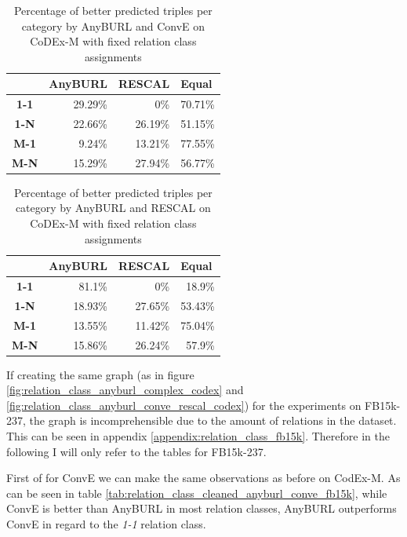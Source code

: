 \begin{table}[H]
\centering
\begin{tabular}{c|rrr}
\multicolumn{1}{l|}{} & \multicolumn{1}{c}{\textbf{AnyBURL}} & \multicolumn{1}{c}{\textbf{RESCAL}} & \multicolumn{1}{l}{\textbf{Equal}} \\ \hline
\textbf{1-1} & 29.29\% & 0\% & 70.71\% \\
\textbf{1-N} & 22.66\% & 26.19\% & 51.15\% \\
\textbf{M-1} & 9.24\% & 13.21\% & 77.55\% \\
\textbf{M-N} & 15.29\% & 27.94\% & 56.77\%
\end{tabular}
\caption{Percentage of better predicted triples per category by AnyBURL and ConvE on CoDEx-M with fixed relation class assignments}
\label{tab:relation_class_cleaned_anyburl_conve_codex}
\end{table}

\begin{table}[H]
\centering
\begin{tabular}{c|rrr}
\multicolumn{1}{l|}{} & \multicolumn{1}{c}{\textbf{AnyBURL}} & \multicolumn{1}{c}{\textbf{RESCAL}} & \multicolumn{1}{l}{\textbf{Equal}} \\ \hline
\textbf{1-1} & 81.1\% & 0\% & 18.9\% \\
\textbf{1-N} & 18.93\% & 27.65\% & 53.43\% \\
\textbf{M-1} & 13.55\% & 11.42\% & 75.04\% \\
\textbf{M-N} & 15.86\% & 26.24\% & 57.9\%
\end{tabular}
\caption{Percentage of better predicted triples per category by AnyBURL and RESCAL on CoDEx-M with fixed relation class assignments}
\label{tab:relation_class_cleaned_anyburl_rescal_codex}
\end{table}

If creating the same graph (as in figure \ref{fig:relation_class_anyburl_complex_codex} and \ref{fig:relation_class_anyburl_conve_rescal_codex}) for the experiments on FB15k-237, the graph is incomprehensible due to the amount of relations in the dataset. This can be seen in appendix \ref{appendix:relation_class_fb15k}. Therefore in the following I will only refer to the tables for FB15k-237.

First of for ConvE we can make the same observations as before on CodEx-M. As can be seen in table \ref{tab:relation_class_cleaned_anyburl_conve_fb15k}, while ConvE is better than AnyBURL in most relation classes, AnyBURL outperforms ConvE in regard to the \textit{1-1} relation class. 

